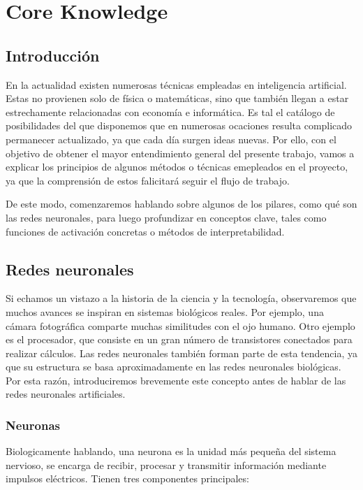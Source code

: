 \chapter{Core Knowledge}\label{cap:planificación}

\section{Introducción}

En la actualidad existen numerosas técnicas empleadas en inteligencia artificial. Estas no provienen solo de física o matemáticas, sino que también llegan a estar estrechamente relacionadas con economía e informática. Es tal el catálogo de posibilidades del que disponemos que en numerosas ocaciones resulta complicado permanecer actualizado, ya que cada día surgen ideas nuevas. Por ello, con el objetivo de obtener el mayor entendimiento general del presente trabajo, vamos a explicar los principios de algunos métodos o técnicas emepleados en el proyecto, ya que la comprensión de estos falicitará seguir el flujo de trabajo. 

De este modo, comenzaremos hablando sobre algunos de los pilares, como qué son las redes neuronales, para luego profundizar en conceptos clave, tales como funciones de activación concretas o métodos de interpretabilidad.


\section{Redes neuronales}

Si echamos un vistazo a la historia de la ciencia y la tecnología, observaremos que muchos avances se inspiran en sistemas biológicos reales. Por ejemplo, una cámara fotográfica comparte muchas similitudes con el ojo humano. Otro ejemplo es el procesador, que consiste en un gran número de transistores conectados para realizar cálculos. Las redes neuronales también forman parte de esta tendencia, ya que su estructura se basa aproximadamente en las redes neuronales biológicas. Por esta razón, introduciremos brevemente este concepto antes de hablar de las redes neuronales artificiales.

\subsection{Neuronas}

Biologicamente hablando, una neurona es la unidad más pequeña del sistema nervioso, se encarga de recibir, procesar y transmitir información mediante impulsos eléctricos. Tienen tres componentes principales:

